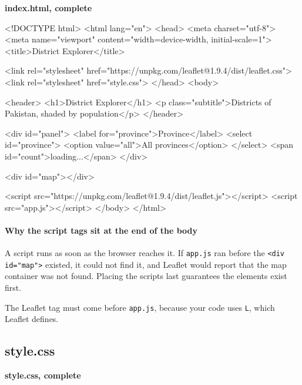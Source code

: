 \documentclass{article}
\newcommand{\cd}[1]{\texttt{#1}}
\newcommand{\codecap}[1]{%
  \par\vspace{.9em}\noindent\textbf{#1}\par\vspace{-.6em}}
\begin{document}
\codecap{index.html, complete}
\begin{code}
<!DOCTYPE html>
<html lang="en">
<head>
  <meta charset="utf-8">
  <meta name="viewport" content="width=device-width, initial-scale=1">
  <title>District Explorer</title>

  <link rel="stylesheet"
        href="https://unpkg.com/leaflet@1.9.4/dist/leaflet.css">
  <link rel="stylesheet" href="style.css">
</head>
<body>

  <header>
    <h1>District Explorer</h1>
    <p class="subtitle">Districts of Pakistan, shaded by population</p>
  </header>

  <div id="panel">
    <label for="province">Province</label>
    <select id="province">
      <option value="all">All provinces</option>
    </select>
    <span id="count">loading...</span>
  </div>

  <div id="map"></div>

  <script src="https://unpkg.com/leaflet@1.9.4/dist/leaflet.js"></script>
  <script src="app.js"></script>
</body>
</html>
\end{code}

\paragraph{Why the script tags sit at the end of the body}
A script runs as soon as the browser reaches it. If \cd{app.js} ran
before the \cd{<div id="map">} existed, it could not find it, and
Leaflet would report that the map container was not found. Placing the
scripts last guarantees the elements exist first.

The Leaflet tag must come before \cd{app.js}, because your code uses
\cd{L}, which Leaflet defines.


\subsection{style.css}

\codecap{style.css, complete}
\end{document}
